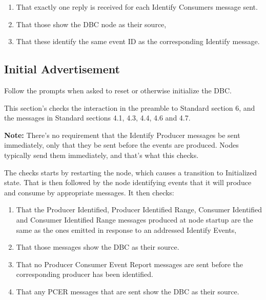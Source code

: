 \documentclass[11pt]{article}
\begin{document}
\begin{enumerate}
\item That exactly one reply is received for each Identify Consumers message sent.
\item That those show the DBC node as their source,
\item That these identify the same event ID as the corresponding Identify message.
\end{enumerate}

\subsection{Initial Advertisement}

Follow the prompts when asked to reset or otherwise initialize the DBC.

This section's checks the interaction in the preamble to Standard section 6, and
the messages in Standard sections 4.1, 4.3, 4.4, 4.6 and 4.7.

\textbf{Note:}  There's no requirement that the Identify Producer messages
be sent immediately, only that they be sent before the events are produced.
Nodes typically send them immediately, and that's what this checks.

The checks starts by restarting the node, which causes a transition to Initialized
state.  That is then followed by the node identifying events that it will 
produce and consume by appropriate messages. It then checks:

\begin{enumerate}
\item That the Producer Identified, Producer Identified Range, Consumer Identified 
    and Consumer Identified Range messages produced at node startup are the same
    as the ones emitted in response to an addressed Identify Events,
\item That those messages show the DBC as their source.
\item That no Producer Consumer Event Report messages are sent before the 
    corresponding producer has been identified.
\item That any PCER messages that are sent show the DBC as their source.
\end{enumerate}
\end{document}
